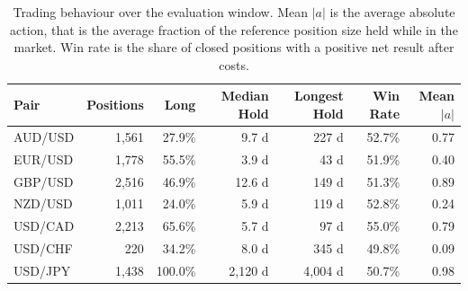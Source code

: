 \begin{table}[htb!]
\centering
\footnotesize
\begin{tabular}{@{}lrrrrrr@{}}
\toprule
\textbf{Pair} & \textbf{Positions} & \textbf{Long} & \textbf{Median Hold} & \textbf{Longest Hold} & \textbf{Win Rate} & \textbf{Mean $|a|$} \\
\midrule
AUD/USD & 1,561 & 27.9\% & 9.7 d & 227 d & 52.7\% & 0.77 \\
EUR/USD & 1,778 & 55.5\% & 3.9 d & 43 d & 51.9\% & 0.40 \\
GBP/USD & 2,516 & 46.9\% & 12.6 d & 149 d & 51.3\% & 0.89 \\
NZD/USD & 1,011 & 24.0\% & 5.9 d & 119 d & 52.8\% & 0.24 \\
USD/CAD & 2,213 & 65.6\% & 5.7 d & 97 d & 55.0\% & 0.79 \\
USD/CHF & 220 & 34.2\% & 8.0 d & 345 d & 49.8\% & 0.09 \\
USD/JPY & 1,438 & 100.0\% & 2,120 d & 4,004 d & 50.7\% & 0.98 \\
\bottomrule
\end{tabular}
\caption{Trading behaviour over the evaluation window. Mean $|a|$ is the average absolute action, that is the average fraction of the reference position size held while in the market. Win rate is the share of closed positions with a positive net result after costs.}
\label{Tables:Behaviour}
\end{table}